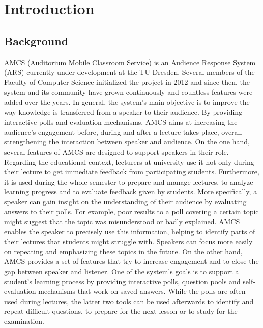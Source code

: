 
\chapter{Introduction}

\section{Background}

AMCS (Auditorium Mobile Classroom Service) is an Audience Response System (ARS) currently under development at the TU Dresden. Several members of the Faculty of Computer Science initialized the project in 2012 and since then, the system and its community have grown continuously and countless features were added over the years.
\newline
\newline
In general, the system's main objective is to improve the way knowledge is transferred from a speaker to their audience. By providing interactive polls and evaluation mechanisms, AMCS aims at increasing the audience's engagement before, during and after a lecture takes place, overall strengthening the interaction between speaker and audience.
\newline
\newline
On the one hand, several features of AMCS are designed to support speakers in their role. Regarding the educational context, lecturers at university use it not only during their lecture to get immediate feedback from participating students. Furthermore, it is used during the whole semester to prepare and manage lectures, to analyze learning progress and to evaluate feedback given by students. More specifically, a speaker can gain insight on the understanding of their audience by evaluating answers to their polls. For example, poor results to a poll covering a certain topic might suggest that the topic was misunderstood or badly explained. AMCS enables the speaker to precisely use this information, helping to identify parts of their lectures that students might struggle with. Speakers can focus more easily on repeating and emphasizing these topics in the future.
\newline
\newline
On the other hand, AMCS provides a set of features that try to increase engagement and to close the gap between speaker and listener.
One of the system's goals is to support a student's learning process by providing interactive polls, question pools and self-evaluation mechanisms that work on saved answers. While the polls are often used during lectures, the latter two tools can be used afterwards to identify and repeat difficult questions, to prepare for the next lesson or to study for the examination. 
\newline
\newline
